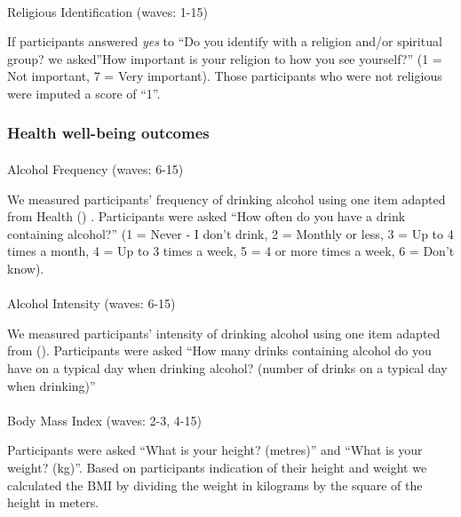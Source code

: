\documentclass[
  singlecolumn,
  9pt]{article}
\makeatletter
\let\oldparagraph\paragraph
\renewcommand{\paragraph}{
    \@ifstar
      \xxxParagraphStar
      \xxxParagraphNoStar
  }
\newcommand{\xxxParagraphStar}[1]{\oldparagraph*{#1}\mbox{}}
\newcommand{\xxxParagraphNoStar}[1]{\oldparagraph{#1}\mbox{}}
\makeatother
\begin{document}
\paragraph{Religious Identification (waves:
1-15)}\label{religious-identification-waves-1-15}

If participants answered \emph{yes} to ``Do you identify with a religion
and/or spiritual group? we asked''How important is your religion to how
you see yourself?'' (1 = Not important, 7 = Very important). Those
participants who were not religious were imputed a score of ``1''.

\subsubsection{Health well-being
outcomes}\label{health-well-being-outcomes}

\paragraph{Alcohol Frequency (waves:
6-15)}\label{alcohol-frequency-waves-6-15}

We measured participants' frequency of drinking alcohol using one item
adapted from Health () .
Participants were asked ``How often do you have a drink containing
alcohol?'' (1 = Never - I don't drink, 2 = Monthly or less, 3 = Up to 4
times a month, 4 = Up to 3 times a week, 5 = 4 or more times a week, 6 =
Don't know).

\paragraph{Alcohol Intensity (waves:
6-15)}\label{alcohol-intensity-waves-6-15}

We measured participants' intensity of drinking alcohol using one item
adapted from ().
Participants were asked ``How many drinks containing alcohol do you have
on a typical day when drinking alcohol? (number of drinks on a typical
day when drinking)''

\paragraph{Body Mass Index (waves: 2-3,
4-15)}\label{body-mass-index-waves-2-3-4-15}

Participants were asked ``What is your height? (metres)'' and ``What is
your weight? (kg)''. Based on participants indication of their height
and weight we calculated the BMI by dividing the weight in kilograms by
the square of the height in meters.
\end{document}

